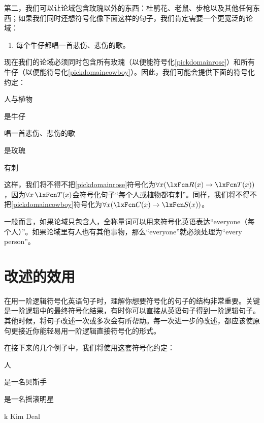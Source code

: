 第二，我们可以让论域包含玫瑰以外的东西：杜鹃花、老鼠、步枪以及其他任何东西；如果我们同时还想符号化像下面这样的句子，我们肯定需要一个更宽泛的论域：


\begin{enumerate}
		\item\label{pickdomaincowboy} 每个牛仔都唱一首悲伤、悲伤的歌。
	\end{enumerate}


现在我们的论域必须同时包含所有玫瑰（以便能符号化\cref*{pickdomainrose}）和所有牛仔（以便能符号化\cref*{pickdomaincowboy}）。因此，我们可能会提供下面的符号化约定：


\begin{ekey}
		\item[\text{论域}] 人与植物
		\item[\atom{C}{x}] 是牛仔
		\item[\atom{S}{x}] 唱一首悲伤、悲伤的歌
		\item[\atom{R}{x}] 是玫瑰
		\item[\atom{T}{x}] 有刺
	\end{ekey}


这样，我们将不得不把\cref*{pickdomainrose}符号化为$\forall x (\atom{R}{x} \eif \atom{T}{x})$，因为$\forall x\, \atom{T}{x}$会符号化句子“每个人或植物都有刺”。同样，我们将不得不把\cref*{pickdomaincowboy}符号化为$\forall x (\atom{C}{x} \eif \atom{S}{x})$。

一般而言，如果论域只包含人，全称量词可以用来符号化英语表达“everyone（每个人）”。如果论域里有人也有其他事物，那么“everyone”就必须处理为“every person”。

\section{改述的效用}
在用一阶逻辑符号化英语句子时，理解你想要符号化的句子的结构非常重要。关键是一阶逻辑中的最终符号化结果，有时你可以直接从英语句子得到一阶逻辑句子。其他时候，将句子改述一次或多次会有所帮助。每一次进一步的改述，都应该使原句更接近你能轻易用一阶逻辑直接符号化的形式。

在接下来的几个例子中，我们将使用这套符号化约定：

\begin{ekey}
		\item[\text{论域}] 人
		\item[\atom{B}{x}]  是一名贝斯手
		\item[\atom{R}{x}]  是一名摇滚明星
		\item[k] Kim Deal
	\end{ekey}


